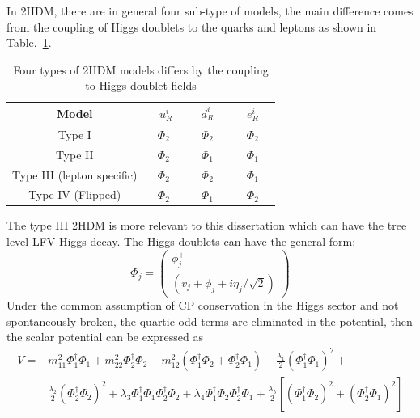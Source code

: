 In 2HDM, there are in general four sub-type of models, the main difference comes from the coupling of Higgs doublets to the quarks and leptons as shown in Table.~\ref{2HDM_models}.
\begin{table}[htp!]
\caption{Four types of 2HDM models differs by the coupling to Higgs doublet fields}
\begin{center}
\begin{tabular}{|c|c|c|c|}
\hline
Model                                 &~  $u^{i}_{R}$~  &~  $d^{i}_{R}$ ~   &~   $e^{i}_{R}$ ~\\\hline
Type I                                 &  $\Phi_{2}$    &  $\Phi_{2}$     &  $\Phi_{2}$   \\\hline
Type II                                &  $\Phi_{2}$    &  $\Phi_{1}$     &  $\Phi_{1}$   \\\hline
Type III (lepton specific)     &  $\Phi_{2}$    &  $\Phi_{2}$     &  $\Phi_{1}$   \\\hline
Type IV (Flipped)                &  $\Phi_{2}$    &  $\Phi_{1}$     &  $\Phi_{2}$   \\\hline
\end{tabular}
\end{center}
\label{2HDM_models}
\end{table}
The type III 2HDM is more relevant to this dissertation which can have the tree level LFV Higgs decay. The Higgs doublets can have the general form:
\begin{equation}
\Phi_{j}=
\begin{pmatrix}
\phi^{+}_{j}    \\
(v_{j}+\phi_{j}+i\eta_{j}/\sqrt{2})
\end{pmatrix}
\end{equation}
Under the common assumption of CP conservation in the Higgs sector and not spontaneously broken, the quartic odd terms are eliminated in the potential, then the scalar potential can be expressed as
\begin{equation}
\begin{aligned}
V=&m^{2}_{11}\Phi^{\dagger}_{1}\Phi_{1}+m^{2}_{22}\Phi^{\dagger}_{2}\Phi_{2}-m^{2}_{12}(\Phi^{\dagger}_{1}\Phi_{2}+\Phi^{\dagger}_{2}\Phi_{1})+\frac{\lambda_{1}}{2}(\Phi^{\dagger}_{1}\Phi_{1})^{2}+\\
  &\frac{\lambda_{2}}{2}(\Phi^{\dagger}_{2}\Phi_{2})^{2}+\lambda_{3}\Phi^{\dagger}_{1}\Phi_{1}\Phi^{\dagger}_{2}\Phi_{2}+\lambda_{4}\Phi^{\dagger}_{1}\Phi_{2}\Phi^{\dagger}_{2}\Phi_{1}+\frac{\lambda_{5}}{2}[(\Phi^{\dagger}_{1}\Phi_{2})^{2}+(\Phi^{\dagger}_{2}\Phi_{1})^{2}]
  \end{aligned}
\end{equation}
